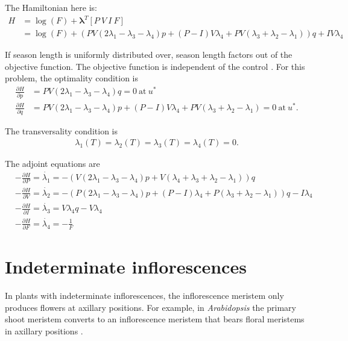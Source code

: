 \documentclass[12pt, oneside,titlepage]{article}   	%
\begin{document}
The Hamiltonian here is:
%
\begin{align}
H & = \log( F ) + \bm{\lambda}^T [P\ V\ I\ F] \\
& = \log( F ) + \left(PV \left(2\lambda_1 -\lambda_3-\lambda_4 \right)p+\left(P-I\right)V\lambda_4+PV (
\lambda_3+\lambda_2-\lambda_1) \right)q+I
 V\lambda_4
\end{align}

If season length is uniformly distributed over, season length factors out of the objective function. The objective function is independent of the control . For this problem, the optimality condition is 
%
\begin{align}
\frac{\partial H}{\partial p} & = PV (2\lambda_1 - \lambda_3-\lambda_4 )q = 0\ \mathrm{at}\ u^* \nonumber \\
\frac{\partial H}{\partial q} & = PV( 2 \lambda_1 - \lambda_3- \lambda_4 )p+(P-I)V \lambda_4+PV (
 \lambda_3+\lambda_2-\lambda_1) = 0\ \mathrm{at}\ u^*.
\end{align}

The transversality condition is
\begin{align}
\lambda_1(T) = \lambda_2(T) = \lambda_3(T) = \lambda_4(T) = 0.
\end{align}

The adjoint equations are
%
\begin{align}
&-\frac{\partial H}{\partial P} = \dot{\lambda_1}  = -( V(2 \lambda_1 - \lambda_3 - \lambda_4)p+V ( \lambda_4+\lambda_3+ \lambda_2 - \lambda_1) )q \nonumber \\
&-\frac{\partial H}{\partial V} = \dot{\lambda_2}  =  -( P ( 2 \lambda_1 - \lambda_3 - \lambda_4 ) p+ ( P-I ) \lambda_4 +P ( \lambda_3+ \lambda_2- \lambda_1) ) q - I \lambda_4 \nonumber \\
&-\frac{\partial H}{\partial I} = \dot{\lambda_3}  = V \lambda_4 q - V \lambda_4  \nonumber \\
&-\frac{\partial H}{\partial F} = \dot{\lambda_4}  = - \frac{1}{F}
\end{align}





\section{Indeterminate inflorescences}

In plants with indeterminate inflorescences, the inflorescence meristem only produces flowers at axillary positions. For example, in \textit{Arabidopsis} the primary shoot meristem converts to an inflorescence meristem that bears floral meristems in axillary positions \cite{bradley1997}.
\end{document}

